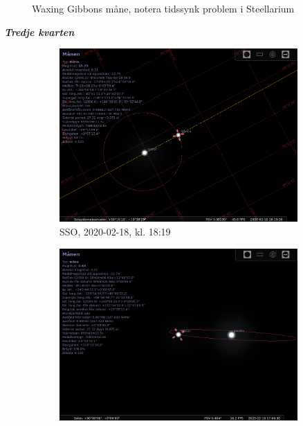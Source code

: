 \documentclass[./exercises.tex]{subfiles}
\begin{document}
\begin{itemize}
\begin{figure}[H]
     \hfill
        \caption{ Waxing Gibbons måne, notera tidssynk problem i Steellarium}
        \label{fig:perod graphs}
\end{figure}
\newpage
\textit{\textbf{Tredje kvarten}}
\begin{figure}[H]
     \centering
     \begin{subfigure}[b]{0.45\textwidth}
         \centering
         \includegraphics[width=\textwidth]{Stellarium1/3rdQ/stellarium-000.png}
         \caption{SSO, 2020-02-18, kl. 18:19}
         \label{fig:y equals x}
     \end{subfigure}
     \hfill
     \begin{subfigure}[b]{0.45\textwidth}
         \centering
         \includegraphics[width=\textwidth]{Stellarium1/3rdQ/stellarium-001.png}

\end{subfigure}
\end{figure}
\end{itemize}
\end{document}
